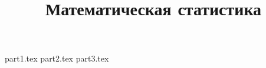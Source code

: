 

\title{Математическая статистика}

\makeindex



\maketitle
{part1.tex}
{part2.tex}
{part3.tex}


\printindex
\tableofcontents

